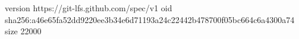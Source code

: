 version https://git-lfs.github.com/spec/v1
oid sha256:a46e65fa52dd9220ee3b34e6d71193a24c22442b478700f05bc664c6a4300a74
size 22000
